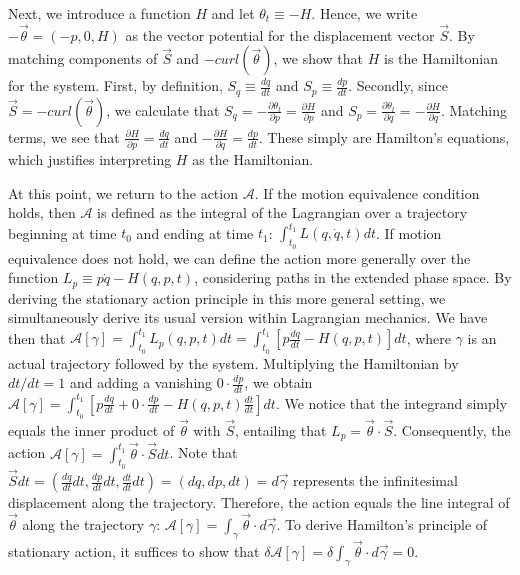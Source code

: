 \documentclass[12pt, twoside]{article}
\renewcommand{\vector}[1]{\ensuremath{\vec{#1}}} %
\newcommand{\integral}{\int}
\begin{document}
Next, we introduce a function $H$ and let $ \theta_t \equiv -H$. Hence, we write $-\vector{\theta} = (-p, 0, H) $ as the vector potential for the displacement vector $\vector{S} $. By matching components of $\vector{S}$ and $-curl(\vector{\theta})$, we show that $H$ is the Hamiltonian for the system. First, by definition, $S_q \equiv \frac{dq}{dt} $ and $S_p \equiv  \frac{dp}{dt} $. Secondly, since $\vector{S} = -curl(\vector{\theta}) $, we calculate that $S_q = -\frac{\partial \theta_t}{\partial p} = \frac{\partial H}{\partial p}$ and $S_p = \frac{\partial \theta_t}{\partial q}=-\frac{\partial H}{\partial q}$. Matching terms, we see that $\frac{\partial H}{\partial p} =\frac{dq}{dt} $ and $-\frac{\partial H}{\partial q} =\frac{dp}{dt}$. These simply are Hamilton's equations, which justifies interpreting $H$ as the Hamiltonian.

At this point, we return to the action $ \mathscr{A}$. If the motion equivalence condition holds, then $ \mathscr{A}$ is defined as the integral of the Lagrangian over a trajectory beginning at time $t_0$ and ending at time $t_1$: $\integral^{t_1}_{t_0} L (q, \dot{q}, t) dt$. If motion equivalence does not hold, we can define the action more generally over the function $L_p \equiv p \dot{q} - H(q, p, t)$, considering paths in the extended phase space. By deriving the stationary action principle in this more general setting, we simultaneously derive its usual version within Lagrangian mechanics. We have then that $ \mathscr{A}[\gamma] = \integral^{t_1}_{t_0} L_p (q, p, t) dt = \integral^{t_1}_{t_0} [p \frac{dq}{dt} - H(q, p, t) ]dt$, where $\gamma$ is an actual trajectory followed by the system. Multiplying the Hamiltonian by $dt/dt = 1$ and adding a vanishing $0 \cdot \frac{dp}{dt}$, we obtain $ \mathscr{A}[\gamma] = \integral^{t_1}_{t_0} [p \frac{dq}{dt} + 0 \cdot \frac{dp}{dt} - H(q, p, t) \frac{dt}{dt} ]dt$. We notice that the integrand simply equals the inner product of $\vector{\theta}$ with $\vector{S} $, entailing that $L_p =\vector{\theta} \cdot \vector{S} $. Consequently, the action $ \mathscr{A} [\gamma] = \integral^{t_1}_{t_0} \vector{\theta} \cdot \vector{S}  dt$. Note that $\vector{S}  dt = (\frac{d q }{d t } dt, \frac{d p }{d t } dt, \frac{d t }{d t }dt ) = (dq, dp, dt) = d\vector{\gamma}$ represents the infinitesimal displacement along the trajectory. Therefore, the action equals the line integral of $\vector{\theta}$ along the trajectory $\gamma $: $ \mathscr{A} [\gamma] =\integral_{\gamma} \vector{\theta} \cdot d\vector{\gamma}$. To derive Hamilton's principle of stationary action, it suffices to show that $\delta \mathscr{A} [\gamma] =\delta \integral_{\gamma} \vector{\theta} \cdot d\vector{\gamma} = 0$. 
\end{document}
